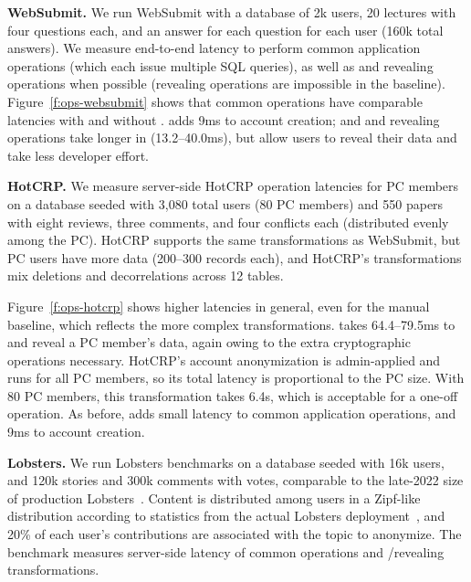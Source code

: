 \textbf{WebSubmit.}
%
We run WebSubmit with a database of 2k users, 20 lectures with four questions
each, and an answer for each question for each user (160k total answers).
%
We measure end-to-end latency to perform common application operations (which
each issue multiple SQL queries), as well as \xxing and revealing operations
when possible (revealing operations are impossible in the baseline).
%
%
%
Figure~\ref{f:ops-websubmit} shows that common operations have comparable
latencies with and without \sys.
%
\sys adds 9ms to account creation; and \xxing and revealing operations take
longer in \sys (13.2--40.0ms), but allow users to reveal their data and take
less developer effort.
%

\textbf{HotCRP.}
%
We measure server-side HotCRP operation latencies for PC members on a database seeded with 3,080
total users (80 PC members)
and 550 papers with eight reviews, three comments, and four conflicts each
(distributed evenly among the PC).
%
HotCRP supports the same \xxing transformations as WebSubmit, but PC users have more
data (200--300 records each), and HotCRP's \xxing transformations mix deletions and
decorrelations across 12 tables. %
%

%
Figure~\ref{f:ops-hotcrp} shows higher latencies in general, even for the manual
baseline, which reflects the more complex \xxing transformations.
%
\sys takes 64.4--79.5ms to \xx and reveal a PC member's data, again owing to the
extra cryptographic operations necessary.
%
HotCRP's account anonymization is admin-applied and runs for all PC members, so
its total latency is proportional to the PC size.
%
With 80 PC members, this transformation takes 6.4s, which is acceptable for a
one-off operation.
%
As before, \sys adds small latency to common application operations, and 9ms to
account creation.
%

\textbf{Lobsters.}
%
We run Lobsters benchmarks on a database seeded with 16k users, and
120k stories and 300k comments with votes, comparable to the late-2022 size of
production Lobsters~\cite{lobsters}.
%
Content is distributed among users in a Zipf-like distribution according to
statistics from the actual Lobsters deployment~\cite{lobsters-data}, and 20\% of
each user's contributions are associated with the topic to anonymize.
%
The benchmark measures server-side latency of common operations and
\xxing/revealing transformations.
%
%
%
%

